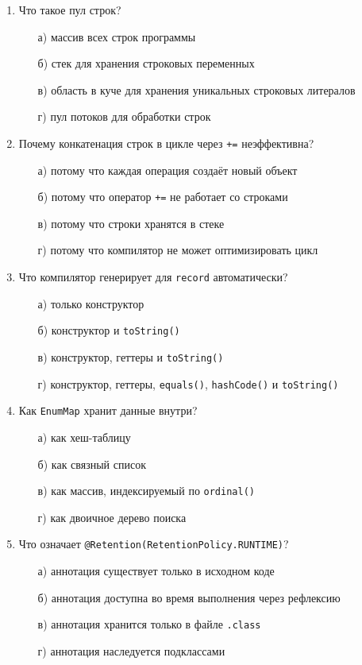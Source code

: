 \begin{enumerate}
\item Что такое пул строк?
  \begin{enumerate}
    \item[а)] массив всех строк программы
    \item[б)] стек для хранения строковых переменных
    \item[в)] область в куче для хранения уникальных строковых литералов
    \item[г)] пул потоков для обработки строк
  \end{enumerate}

\item Почему конкатенация строк в цикле через \texttt{+=} неэффективна?
  \begin{enumerate}
    \item[а)] потому что каждая операция создаёт новый объект
    \item[б)] потому что оператор \texttt{+=} не работает со строками
    \item[в)] потому что строки хранятся в стеке
    \item[г)] потому что компилятор не может оптимизировать цикл
  \end{enumerate}

\item Что компилятор генерирует для \texttt{record} автоматически?
  \begin{enumerate}
    \item[а)] только конструктор
    \item[б)] конструктор и \texttt{toString()}
    \item[в)] конструктор, геттеры и \texttt{toString()}
    \item[г)] конструктор, геттеры, \texttt{equals()}, \texttt{hashCode()} и
              \texttt{toString()}
  \end{enumerate}

\item Как \texttt{EnumMap} хранит данные внутри?
  \begin{enumerate}
    \item[а)] как хеш-таблицу
    \item[б)] как связный список
    \item[в)] как массив, индексируемый по \texttt{ordinal()}
    \item[г)] как двоичное дерево поиска
  \end{enumerate}

\item Что означает \texttt{@Retention(RetentionPolicy.RUNTIME)}?
  \begin{enumerate}
    \item[а)] аннотация существует только в исходном коде
    \item[б)] аннотация доступна во время выполнения через рефлексию
    \item[в)] аннотация хранится только в файле \texttt{.class}
    \item[г)] аннотация наследуется подклассами
  \end{enumerate}


\end{enumerate}
